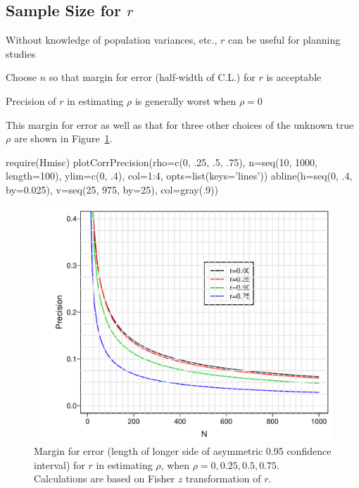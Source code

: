 \subsection{Sample Size for $r$}
\bi
\item Without knowledge of population variances, etc., $r$ can be
  useful for planning studies
\item Choose $n$ so that margin for error (half-width of C.L.) for $r$
  is acceptable
\item Precision of $r$ in estimating $\rho$ is generally worst when $\rho=0$
\item This margin for error as well as that for three other choices of the unknown true $\rho$ are shown in Figure~\ref{fig:corr-moe}.
\begin{Schunk}
\begin{Sinput}
require(Hmisc)
plotCorrPrecision(rho=c(0, .25, .5, .75),
                  n=seq(10, 1000, length=100),
                  ylim=c(0, .4), col=1:4, opts=list(keys='lines'))
abline(h=seq(0, .4, by=0.025),
       v=seq(25, 975, by=25), col=gray(.9))
\end{Sinput}
\begin{figure}[htbp]

\centerline{\includegraphics[width=\maxwidth]{corr-moe-1} }

\caption[Margin of error for estimating correlation coefficient]{Margin for error (length of longer side of asymmetric 0.95 confidence interval) for $r$ in estimating $\rho$, when $\rho=0, 0.25, 0.5, 0.75$.  Calculations are based on Fisher $z$ transformation of $r$.}\label{fig:corr-moe}
\end{figure}
\end{Schunk}
\ei


